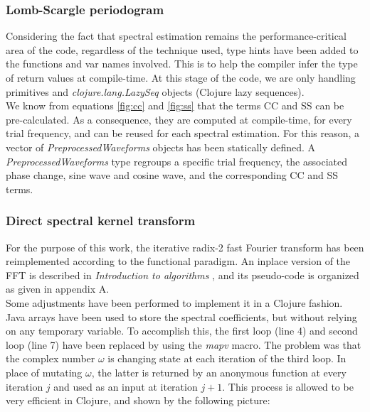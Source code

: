 \documentclass[letterpaper]{article}
\begin{document}
\subsubsection{Lomb-Scargle periodogram}

Considering the fact that spectral estimation remains the performance-critical area of the code, regardless of the technique used, type hints have been added to the functions and var names involved. This is to help the compiler infer the type of return values at compile-time.
At this stage of the code, we are only handling primitives and \textit{clojure.lang.LazySeq} objects (Clojure lazy sequences).\\

We know from equations \ref{fig:cc} and \ref{fig:ss} that the terms CC and SS can be pre-calculated. As a consequence, they are computed at compile-time,
for every trial frequency, and can be reused for each spectral estimation. For this reason, a vector of \textit{PreprocessedWaveforms} objects has been statically defined. A \textit{PreprocessedWaveforms}
type regroups a specific trial frequency, the associated phase change, sine wave and cosine wave, and the corresponding CC and SS terms.\\

\subsubsection{Direct spectral kernel transform}

For the purpose of this work, the iterative radix-2 fast Fourier transform has been reimplemented according to the functional paradigm. An inplace version of the FFT is described in \textit{Introduction to algorithms} \citep{FFT}, and its pseudo-code is organized as given in appendix A. \\

Some adjustments have been performed to implement it in a Clojure fashion. Java arrays have been used to store the spectral coefficients, but without relying on any temporary variable. To accomplish this, the first loop (line 4) and second loop (line 7) have been replaced by using the \textit{mapv} macro. The problem was that the complex number $\omega$ is changing state at each iteration of the third loop. In place of mutating $\omega$, the latter is returned by an anonymous function at every iteration $j$ and used as an input at iteration $j + 1$. This process is allowed to be very efficient in Clojure, and shown by the following picture:
\end{document}
